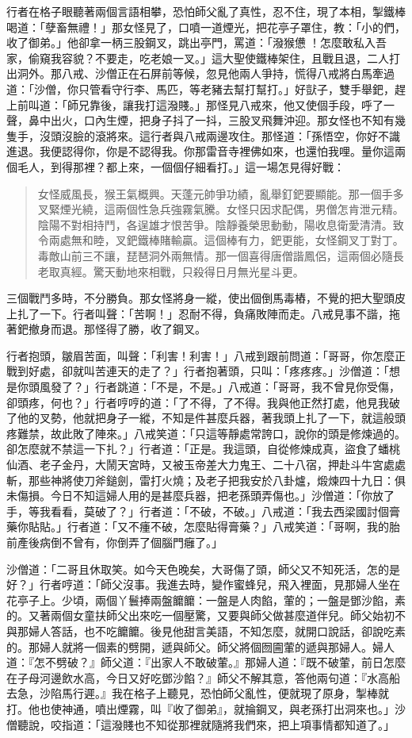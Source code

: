 行者在格子眼聽著兩個言語相攀，恐怕師父亂了真性，忍不住，現了本相，掣鐵棒喝道：「孽畜無禮！」那女怪見了，口噴一道煙光，把花亭子罩住，教：「小的們，收了御弟。」他卻拿一柄三股鋼叉，跳出亭門，罵道：「潑猴憊𪬯！怎麼敢私入吾家，偷窺我容貌？不要走，吃老娘一叉。」這大聖使鐵棒架住，且戰且退，二人打出洞外。那八戒、沙僧正在石屏前等候，忽見他兩人爭持，慌得八戒將白馬牽過道：「沙僧，你只管看守行李、馬匹，等老豬去幫打幫打。」好獃子，雙手舉鈀，趕上前叫道：「師兄靠後，讓我打這潑賤。」那怪見八戒來，他又使個手段，呼了一聲，鼻中出火，口內生煙，把身子抖了一抖，三股叉飛舞沖迎。那女怪也不知有幾隻手，沒頭沒臉的滾將來。這行者與八戒兩邊攻住。那怪道：「孫悟空，你好不識進退。我便認得你，你是不認得我。你那雷音寺裡佛如來，也還怕我哩。量你這兩個毛人，到得那裡？都上來，一個個仔細看打。」這一場怎見得好戰：
\begin{quote}
女怪威風長，猴王氣概興。天蓬元帥爭功績，亂舉釘鈀要顯能。那一個手多叉緊煙光繞，這兩個性急兵強霧氣騰。女怪只因求配偶，男僧怎肯泄元精。陰陽不對相持鬥，各逞雄才恨苦爭。陰靜養榮思動動，陽收息衛愛清清。致令兩處無和睦，叉鈀鐵棒賭輸贏。這個棒有力，鈀更能，女怪鋼叉丁對丁。毒敵山前三不讓，琵琶洞外兩無情。那一個喜得唐僧諧鳳侶，這兩個必隨長老取真經。驚天動地來相戰，只殺得日月無光星斗更。
\end{quote}

三個戰鬥多時，不分勝負。那女怪將身一縱，使出個倒馬毒樁，不覺的把大聖頭皮上扎了一下。行者叫聲：「苦啊！」忍耐不得，負痛敗陣而走。八戒見事不諧，拖著鈀撤身而退。那怪得了勝，收了鋼叉。

行者抱頭，皺眉苦面，叫聲：「利害！利害！」八戒到跟前問道：「哥哥，你怎麼正戰到好處，卻就叫苦連天的走了？」行者抱著頭，只叫：「疼疼疼。」沙僧道：「想是你頭風發了？」行者跳道：「不是，不是。」八戒道：「哥哥，我不曾見你受傷，卻頭疼，何也？」行者哼哼的道：「了不得，了不得。我與他正然打處，他見我破了他的叉勢，他就把身子一縱，不知是件甚麼兵器，著我頭上扎了一下，就這般頭疼難禁，故此敗了陣來。」八戒笑道：「只這等靜處常誇口，說你的頭是修煉過的。卻怎麼就不禁這一下扎？」行者道：「正是。我這頭，自從修煉成真，盜食了蟠桃仙酒、老子金丹，大鬧天宮時，又被玉帝差大力鬼王、二十八宿，押赴斗牛宮處處斬，那些神將使刀斧鎚劍，雷打火燒；及老子把我安於八卦爐，煅煉四十九日：俱未傷損。今日不知這婦人用的是甚麼兵器，把老孫頭弄傷也。」沙僧道：「你放了手，等我看看，莫破了？」行者道：「不破，不破。」八戒道：「我去西梁國討個膏藥你貼貼。」行者道：「又不瘇不破，怎麼貼得膏藥？」八戒笑道：「哥啊，我的胎前產後病倒不曾有，你倒弄了個腦門癰了。」

沙僧道：「二哥且休取笑。如今天色晚矣，大哥傷了頭，師父又不知死活，怎的是好？」行者哼道：「師父沒事。我進去時，變作蜜蜂兒，飛入裡面，見那婦人坐在花亭子上。少頃，兩個丫鬟捧兩盤饝饝：一盤是人肉餡，葷的；一盤是鄧沙餡，素的。又著兩個女童扶師父出來吃一個壓驚，又要與師父做甚麼道伴兒。師父始初不與那婦人答話，也不吃饝饝。後見他甜言美語，不知怎麼，就開口說話，卻說吃素的。那婦人就將一個素的劈開，遞與師父。師父將個囫圇葷的遞與那婦人。婦人道：『怎不劈破？』師父道：『出家人不敢破葷。』那婦人道：『既不破葷，前日怎麼在子母河邊飲水高，今日又好吃鄧沙餡？』師父不解其意，答他兩句道：『水高船去急，沙陷馬行遲。』我在格子上聽見，恐怕師父亂性，便就現了原身，掣棒就打。他也使神通，噴出煙霧，叫『收了御弟』，就掄鋼叉，與老孫打出洞來也。」沙僧聽說，咬指道：「這潑賤也不知從那裡就隨將我們來，把上項事情都知道了。」

